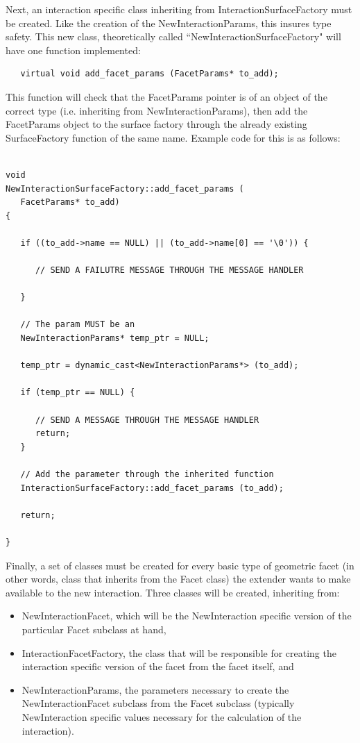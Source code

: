 Next, an interaction specific class inheriting from
InteractionSurfaceFactory must be created. Like the creation of the
NewInteractionParams, this insures type safety. This new class,
theoretically called ``NewInteractionSurfaceFactory" will have one
function implemented:

\begin{verbatim}
   virtual void add_facet_params (FacetParams* to_add);
\end{verbatim}

This function will check that the FacetParams pointer is of an object
of the correct type (i.e. inheriting from NewInteractionParams), then
add the FacetParams object to the surface factory through the already
existing SurfaceFactory function of the same name. Example code
for this is as follows:

\begin{verbatim}

void
NewInteractionSurfaceFactory::add_facet_params (
   FacetParams* to_add)
{

   if ((to_add->name == NULL) || (to_add->name[0] == '\0')) {

      // SEND A FAILUTRE MESSAGE THROUGH THE MESSAGE HANDLER

   }

   // The param MUST be an
   NewInteractionParams* temp_ptr = NULL;

   temp_ptr = dynamic_cast<NewInteractionParams*> (to_add);

   if (temp_ptr == NULL) {

      // SEND A MESSAGE THROUGH THE MESSAGE HANDLER
      return;
   }

   // Add the parameter through the inherited function
   InteractionSurfaceFactory::add_facet_params (to_add);

   return;

}
\end{verbatim}

Finally, a set of classes must be created for every basic type of geometric facet
(in other words, class that inherits from the Facet class) the extender
wants to make available to the new interaction. Three classes will be created,
inheriting from:

\begin{itemize}
\item{NewInteractionFacet}, which will be the NewInteraction specific version
of the particular Facet subclass at hand,
\item{InteractionFacetFactory}, the class that will be responsible for creating
the interaction specific version of the facet from the facet itself, and
\item{NewInteractionParams}, the parameters necessary to create the
NewInteractionFacet subclass from the Facet subclass (typically NewInteraction
specific values necessary for the calculation of the interaction).
\end{itemize}

